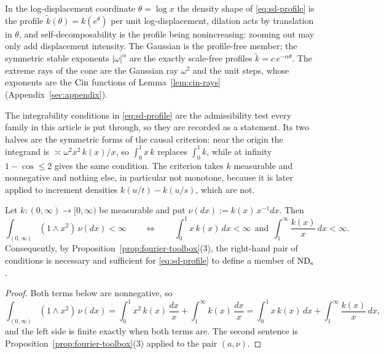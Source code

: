 \begin{remark}\label{rem:displacement-profile-log}
In the log-displacement coordinate $\theta = \log x$ the density shape of \ref{eq:sd-profile}
is the profile $\tilde k(\theta) = k(e^\theta)$ per unit log-displacement, dilation acts by
translation in $\theta$, and self-decomposability is the profile being nonincreasing: zooming
out may only add displacement intensity. The Gaussian is the profile-free member; the
symmetric stable exponents $|\omega|^\alpha$ are the exactly scale-free profiles
$\tilde k = c\,e^{-\alpha\theta}$. The extreme rays of the cone are the Gaussian ray
$\omega^2$ and the unit steps, whose exponents are the $\operatorname{Cin}$ functions of
Lemma~\ref{lem:cin-rays} (Appendix~\ref{sec:appendix}).
\end{remark}

The integrability conditions in \ref{eq:sd-profile} are the admissibility test every family
in this article is put through, so they are recorded as a statement. Its two halves are the
symmetric forms of the causal criterion: near the origin the integrand is
$\asymp \omega^2x^2\,k(x)/x$, so $\int_0^1 x\,k$ replaces $\int_0^1 k$, while at infinity
$1 - \cos \le 2$ gives the same condition. The criterion takes $k$ measurable and nonnegative
and nothing else, in particular not monotone, because it is later applied to increment
densities $k(u/t) - k(u/s)$, which are not.

\begin{lemma}\label{lem:profile-integrability}
Let $k : (0,\infty) \to [0,\infty)$ be measurable and put $\nu(dx) := k(x)\,x^{-1}dx$. Then
\[
  \int_{(0,\infty)} (1 \wedge x^2)\,\nu(dx) < \infty
  \qquad\Longleftrightarrow\qquad
  \int_0^1 x\,k(x)\,dx < \infty \ \ \text{and} \ \
  \int_1^\infty \frac{k(x)}{x}\,dx < \infty .
\]
Consequently, by Proposition~\ref{prop:fourier-toolbox}(3), the right-hand pair of conditions
is necessary and sufficient for \ref{eq:sd-profile} to define a member of $\mathrm{ND}_{\mathrm{s}}$.
\end{lemma}

\begin{proof}
Both terms below are nonnegative, so
\[
  \int_{(0,\infty)}(1 \wedge x^2)\,\nu(dx)
  = \int_0^1 x^2\,k(x)\,\frac{dx}{x} + \int_1^\infty k(x)\,\frac{dx}{x}
  = \int_0^1 x\,k(x)\,dx + \int_1^\infty \frac{k(x)}{x}\,dx,
\]
and the left side is finite exactly when both terms are. The second sentence is
Proposition~\ref{prop:fourier-toolbox}(3) applied to the pair $(a,\nu)$.
\end{proof}


